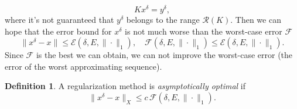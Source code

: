 \documentclass[10pt, a4paper, twoside, openright]{book}
\theoremstyle{definition}
\newtheorem{definition}[subsection]{Definition}
\theoremstyle{plain}
\theoremstyle{plain}
\theoremstyle{plain}
\theoremstyle{plain}
\theoremstyle{plain}
\theoremstyle{plain}
\theoremstyle{plain}
\theoremstyle{plain}
\begin{document}
\begin{equation}
 Kx^\delta = y^\delta,
\end{equation}
where it's not guaranteed that $y^\delta$ belongs to the range $\mathcal{R}(K)$.
Then we can hope that the error bound for $x^\delta$ is not much worse than the 
worst-case error $\mathcal{F}$
\begin{equation}
 \|x^\delta -x\| \leq \mathcal{E}(\delta, E, \|\cdot\|_1), \quad \mathcal{F}(\delta, E, \|\cdot\|_1)\leq\mathcal{E}(\delta, E, \|\cdot\|_1).
\end{equation}
Since $\mathcal{F}$ is the best we can obtain, we can not improve the worst-case error (the error of the worst approximating sequence).
\begin{definition}
A regularization method is \emph{asymptotically optimal} if 
\begin{equation}
 \|x^\delta - x\|_X \leq c\,\mathcal{F}(\delta, E, \|\cdot\|_1).
\end{equation}
\end{definition}
\end{document}
